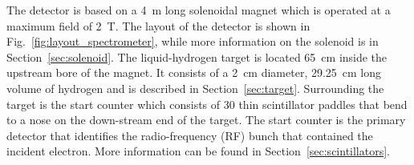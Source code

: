 The \gx{} detector is based on a 4~m long solenoidal magnet which is operated at a maximum field of 2~T. The layout of the detector is shown in Fig.~\ref{fig:layout_spectrometer}, while more information on the solenoid is in Section~\ref{sec:solenoid}. The liquid-hydrogen target is located 65~cm inside the upstream bore of the magnet. It consists of a 2~cm diameter, 29.25~cm long volume of hydrogen and is described in Section~\ref{sec:target}. Surrounding the target is the start counter which consists of 30 thin scintillator paddles that bend to a nose on the down-stream end of the target. The start counter is the primary detector that identifies the radio-frequency (RF) bunch that contained the incident electron. More information can be found in Section~\ref{sec:scintillators}. 


